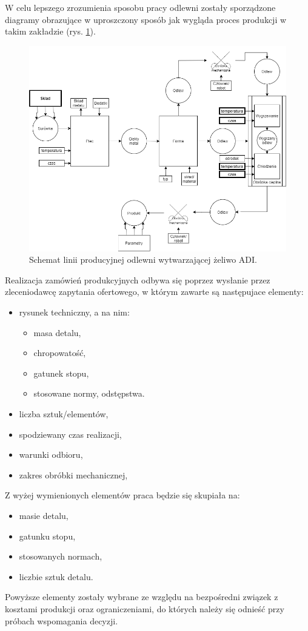 W celu lepszego zrozumienia sposobu pracy odlewni zostały sporządzone diagramy obrazujące w uproszczony sposób jak wygląda proces produkcji w takim zakładzie (rys. \ref{fig:schemat_linii}).
\begin{figure}[ht]{}
	\centering
	\includegraphics[scale=0.4]{images/schemat_prod.png}
	\caption {
		 Schemat linii producyjnej odlewni wytwarzającej żeliwo ADI.
	}
	\label{fig:schemat_linii}
\end{figure}
Realizacja zamówień produkcyjnych odbywa się poprzez wysłanie przez zleceniodawcę zapytania ofertowego, w którym zawarte są następujace elementy:
\begin{itemize}
    \item rysunek techniczny, a na nim:
    \begin{itemize}
        \item masa detalu,
        \item chropowatość,
        \item gatunek stopu,
        \item stosowane normy, odstępstwa.
    \end{itemize}
    \item liczba sztuk/elementów,
    \item spodziewany czas realizacji,
    \item warunki odbioru,
    \item zakres obróbki mechanicznej,
\end{itemize}
Z wyżej wymienionych elementów praca będzie się skupiała na:
\begin{itemize}
    \item masie detalu,
    \item gatunku stopu,
    \item stosowanych normach,
    \item liczbie sztuk detalu.
\end{itemize}
Powyższe elementy zostały wybrane ze względu na bezpośredni związek z kosztami produkcji oraz ograniczeniami, do których należy się odnieść przy próbach wspomagania decyzji.

